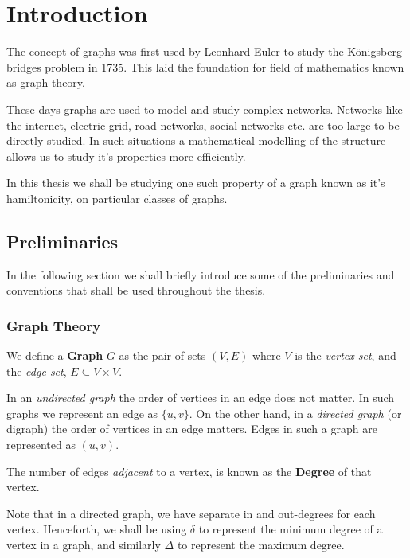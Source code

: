 
\chapter{Introduction}
\vspace{2em}

The concept of graphs was first used by Leonhard Euler to study the Königsberg bridges problem \cite{euler:konis} in 1735. This laid the foundation for field of mathematics known as graph theory. 

\noindent
These days graphs are used to model and study complex networks. Networks like the internet, electric grid, road networks, social networks etc. are too large to be directly studied.  In such situations a mathematical modelling of the structure allows us to study it's properties more efficiently.

\noindent
In this thesis we shall be studying one such property of a graph known as it's hamiltonicity, on particular classes of graphs.

\section{Preliminaries}
In the following section we shall briefly introduce some of the preliminaries and conventions that shall be used throughout the thesis.

\subsection{Graph Theory}

\begin{defn}
We define a \textbf{Graph} $G$ as the pair of sets $(V, E)$ where $V$ is the \textit{vertex set}, and the \textit{edge set}, $E \subseteq V \times V$.
\end{defn}
In an \textit{undirected graph} the order of vertices in an edge does not matter. In such graphs we represent an edge as $\{u, v\}$. On the other hand, in a \textit{directed graph} (or digraph) the order of vertices in an edge matters. Edges in such a graph are represented as $(u, v)$.

\begin{defn}
The number of edges \textit{adjacent} to a vertex, is known as the \textbf{Degree} of that vertex.
\end{defn}
Note that in a directed graph, we have separate in and out-degrees for each vertex. Henceforth, we shall be using $\delta$ to represent the minimum degree of a vertex in a graph, and similarly $\Delta$ to represent the maximum degree.

